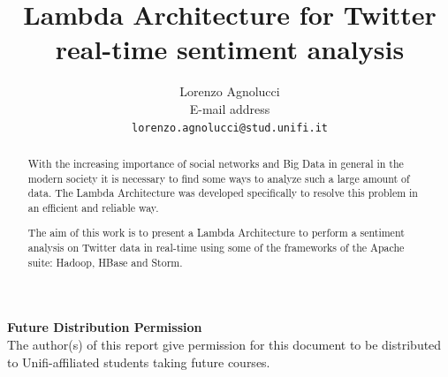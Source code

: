 \documentclass[10pt,twocolumn,letterpaper]{article}
\begin{document}
\title{Lambda Architecture for Twitter real-time sentiment analysis}

\author{Lorenzo Agnolucci\\
E-mail address\\
{\tt\small lorenzo.agnolucci@stud.unifi.it}
}

\maketitle
\thispagestyle{empty}

\begin{abstract}
With the increasing importance of social networks and Big Data in general in the modern society it is necessary to find some ways to analyze such a large amount of data. The Lambda Architecture was developed specifically to resolve this problem in an efficient and reliable way.

The aim of this work is to present a Lambda Architecture to perform a sentiment analysis on Twitter data in real-time using some of the frameworks of the Apache suite: Hadoop, HBase and Storm.
\end{abstract}

\noindent\large\textbf{Future Distribution Permission}\\
\indent The author(s) of this report give permission for this document to be distributed to Unifi-affiliated students taking future courses.
\end{document}
